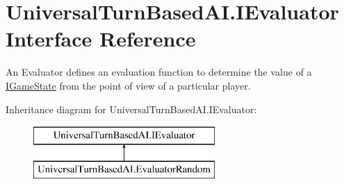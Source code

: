 \hypertarget{interface_universal_turn_based_a_i_1_1_i_evaluator}{}\section{Universal\+Turn\+Based\+A\+I.\+I\+Evaluator Interface Reference}
\label{interface_universal_turn_based_a_i_1_1_i_evaluator}


An Evaluator defines an evaluation function to determine the value of a \hyperlink{interface_universal_turn_based_a_i_1_1_i_game_state}{I\+Game\+State} from the point of view of a particular player.  


Inheritance diagram for Universal\+Turn\+Based\+A\+I.\+I\+Evaluator\+:\begin{figure}[H]
\begin{center}
\leavevmode
\includegraphics[height=2.000000cm]{interface_universal_turn_based_a_i_1_1_i_evaluator}
\end{center}
\end{figure}
